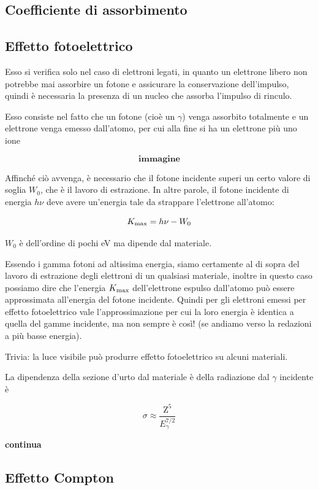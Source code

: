 \subsection{Coefficiente di assorbimento}

\subsection{Effetto fotoelettrico}

Esso si verifica solo nel caso di elettroni legati, in quanto un elettrone libero non potrebbe mai assorbire un fotone e assicurare la conservazione dell'impulso, quindi è necessaria la presenza di un nucleo che assorba l'impulso di rinculo.

Esso consiste nel fatto che un fotone (cioè un $\gamma$) venga assorbito totalmente e un elettrone venga emesso dall'atomo, per cui alla fine si ha un elettrone più uno ione

$$\textbf{immagine}$$

Affinché ciò avvenga, è necessario che il fotone incidente superi un certo valore di soglia $W_0$, che è il lavoro di estrazione. In altre parole, il fotone incidente di energia $h\nu$ deve avere un'energia tale da strappare l'elettrone all'atomo:

$$K_{\rm max}=h\nu - W_0$$

$W_0$ è dell'ordine di pochi eV ma dipende dal materiale.

Essendo i gamma fotoni ad altissima energia, siamo certamente al di sopra del lavoro di estrazione degli elettroni di un qualsiasi materiale, inoltre in questo caso possiamo dire che l'energia $K_{\rm max}$ dell'elettrone espulso dall'atomo può essere approssimata all'energia del fotone incidente. Quindi per gli elettroni emessi per effetto fotoelettrico vale l'approssimazione per cui la loro energia è identica a quella del gamme incidente, ma non sempre è così! (se andiamo verso la redazioni a più basse energia).

Trivia: la luce visibile può produrre effetto fotoelettrico su alcuni materiali.

La dipendenza della sezione d'urto dal materiale è della radiazione dal $\gamma$ incidente è

$$\sigma \approx \frac{\text{Z}^5}{E_{\gamma}^{7/2}}$$

\textbf{continua}

\subsection{Effetto Compton}

